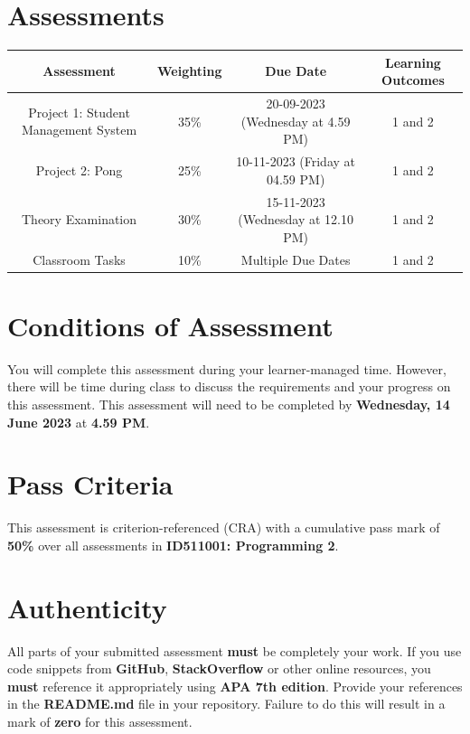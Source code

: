 \documentclass{article}
\begin{document}
\section*{Assessments}
\renewcommand{\arraystretch}{1.5}
\begin{tabular}{|c|c|c|c|}
	\hline
	\textbf{Assessment}                                 & \textbf{Weighting} & \textbf{Due Date}            & \textbf{Learning Outcomes} \\ \hline
	\small Project 1: Student Management System  & \small 35\%        & \small 20-09-2023 (Wednesday at 4.59 PM)   & \small 1 and 2                   \\ \hline
	\small Project 2: Pong & \small 25\%        & \small 10-11-2023 (Friday at 04.59 PM)  & \small 1 and 2                   \\ \hline
	\small Theory Examination                        & \small 30\%        & \small 15-11-2023 (Wednesday at 12.10 PM)  & \small 1 and 2                   \\ \hline
	\small Classroom Tasks                       & \small 10\%        & \small Multiple Due Dates  & \small 1 and 2                   \\ \hline
\end{tabular} 


\section*{Conditions of Assessment}
You will complete this assessment during your learner-managed time. However, there will be time during class to discuss the requirements and your progress on this assessment. This assessment will need to be completed by \textbf{Wednesday, 14 June 2023} at \textbf{4.59 PM}.

\section*{Pass Criteria}
This assessment is criterion-referenced (CRA) with a cumulative pass mark of \textbf{50\%} over all assessments in \textbf{ID511001: Programming 2}.

\section*{Authenticity}
All parts of your submitted assessment \textbf{must} be completely your work. If you use code snippets from \textbf{GitHub}, \textbf{StackOverflow} or other online resources, you \textbf{must} reference it appropriately using \textbf{APA 7th edition}. Provide your references in the \textbf{README.md} file in your repository. Failure to do this will result in a mark of \textbf{zero} for this assessment.
\end{document}
